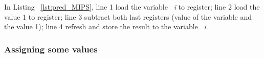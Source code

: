 \documentclass[
  oneside,
  11pt, a4paper,
  footinclude=true,
  headinclude=true,
  cleardoublepage=empty
]{scrbook}
\begin{document}
In Listing ~\ref{lst:pred_MIPS}, line 1 load the variable ~\textit{i} to register; line 2 load the value 1 to register; line 3 subtract both last registers (value of the variable and the value 1); line 4 refresh and store the result to the variable ~\textit{i}.

\subsubsection{Assigning some values}


































\end{document}

